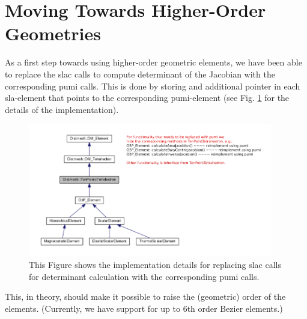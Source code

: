 \documentclass[review,authoryear,12pt]{elsarticle_summary_report}
\begin{document}
\section{Moving Towards Higher-Order Geometries}
As a first step towards using higher-order geometric elements, we have been able to replace the slac calls to compute determinant of the Jacobian with the corresponding pumi calls. This is done by storing and additional pointer in each sla-element that points to the corresponding  pumi-element (see Fig. \ref{imp} for the details of the implementation). 
\begin{figure}[ph!]
\centering
\includegraphics[width=0.95\textwidth]{hide_ten_point_tet.png}
\caption{\label{imp} This Figure shows the implementation details for replacing slac calls for determinant calculation with the corresponding pumi calls.}
\end{figure}
This, in theory, should make it possible to raise the (geometric) order of the elements. (Currently, we have support for up to 6th order Bezier elements.)

% 
%  
\end{document}
